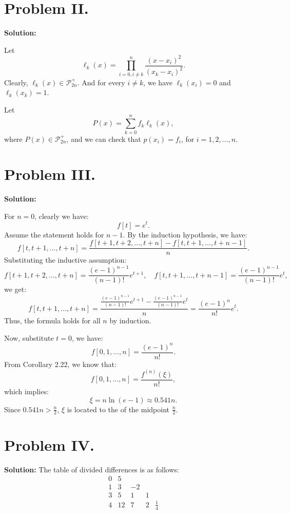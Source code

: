 \documentclass[a4paper, 12pt]{article}
\renewcommand{\qed}{\hfill \boxed{\mathbb{Q.E.D.}}}
\begin{document}
\section*{Problem II.}

\textbf{Solution:}

Let 
\[
\ell_k(x) = \prod_{i=0, i \neq k}^{n} \frac{(x - x_i)^2}{(x_k - x_i)^2}.
\]
Clearly, \( \ell_k(x) \in \mathcal{P}_{2n}^+ \). And for every \( i \neq k \), we have \( \ell_k(x_i) = 0 \) and \( \ell_k(x_k) = 1 \).

Let
\[
P(x) = \sum_{k=0}^{n} f_k \ell_k(x),
\]
where \( P(x) \in \mathcal{P}_{2n}^+ \), and we can check that \( p(x_i) = f_i \), for \( i = 1, 2, \dots, n \).

\qed

\section*{Problem III.}

\textbf{Solution:}

For \( n = 0 \), clearly we have:
\[
f[t] = e^t.
\]
Assume the statement holds for \( n-1 \). By the induction hypothesis, we have:
\[
f[t, t+1, \dots, t+n] = \frac{f[t+1, t+2, \dots, t+n] - f[t, t+1, \dots, t+n-1]}{n}.
\]
Substituting the inductive assumption:
\[
f[t+1, t+2, \dots, t+n] = \frac{(e-1)^{n-1}}{(n-1)!} e^{t+1}, \quad f[t, t+1, \dots, t+n-1] = \frac{(e-1)^{n-1}}{(n-1)!} e^{t},
\]
we get:
\[
f[t, t+1, \dots, t+n] = \frac{\frac{(e-1)^{n-1}}{(n-1)!} e^{t+1} - \frac{(e-1)^{n-1}}{(n-1)!} e^t}{n} = \frac{(e-1)^n}{n!} e^t.
\]
Thus, the formula holds for all \( n \) by induction.

\qed

Now, substitute \( t = 0 \), we have:
\[
f[0, 1, \dots, n] = \frac{(e-1)^n}{n!}.
\]
From Corollary 2.22, we know that:
\[
f[0, 1, \dots, n] = \frac{f^{(n)}(\xi)}{n!},
\]
which implies:
\[
\xi = n \ln(e-1) \approx 0.541n.
\]
Since \( 0.541n > \frac{n}{2} \), \( \xi \) is located to the  of the midpoint \( \frac{n}{2} \).

\section*{Problem IV.}

\textbf{Solution:}
The table of divided differences is as follows:
\[
\begin{array}{c|cccc}
    0 & 5 &  &  &  \\
    1 & 3 & -2 &  &  \\
    3 & 5 & 1 & 1 &  \\
    4 & 12 & 7 & 2 & \frac{1}{4}
\end{array}
\]
\end{document}
